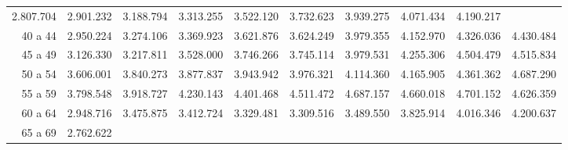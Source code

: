 \begin{tabular}{llllllllll}
  \multicolumn{1}{|r}{2.807.704} &
  \multicolumn{1}{r}{2.901.232} &
  \multicolumn{1}{r}{3.188.794} &
  \multicolumn{1}{r}{3.313.255} &
  \multicolumn{1}{r}{3.522.120} &
  \multicolumn{1}{r}{3.732.623} &
  \multicolumn{1}{r}{3.939.275} &
  \multicolumn{1}{r}{4.071.434} &
  \multicolumn{1}{r}{4.190.217} \\
\multicolumn{1}{r}{40 a 44\hspace{1em}} &
  \multicolumn{1}{|r}{2.950.224} &
  \multicolumn{1}{r}{3.274.106} &
  \multicolumn{1}{r}{3.369.923} &
  \multicolumn{1}{r}{3.621.876} &
  \multicolumn{1}{r}{3.624.249} &
  \multicolumn{1}{r}{3.979.355} &
  \multicolumn{1}{r}{4.152.970} &
  \multicolumn{1}{r}{4.326.036} &
  \multicolumn{1}{r}{4.430.484} \\
\multicolumn{1}{r}{45 a 49\hspace{1em}} &
  \multicolumn{1}{|r}{3.126.330} &
  \multicolumn{1}{r}{3.217.811} &
  \multicolumn{1}{r}{3.528.000} &
  \multicolumn{1}{r}{3.746.266} &
  \multicolumn{1}{r}{3.745.114} &
  \multicolumn{1}{r}{3.979.531} &
  \multicolumn{1}{r}{4.255.306} &
  \multicolumn{1}{r}{4.504.479} &
  \multicolumn{1}{r}{4.515.834} \\
\multicolumn{1}{r}{50 a 54\hspace{1em}} &
  \multicolumn{1}{|r}{3.606.001} &
  \multicolumn{1}{r}{3.840.273} &
  \multicolumn{1}{r}{3.877.837} &
  \multicolumn{1}{r}{3.943.942} &
  \multicolumn{1}{r}{3.976.321} &
  \multicolumn{1}{r}{4.114.360} &
  \multicolumn{1}{r}{4.165.905} &
  \multicolumn{1}{r}{4.361.362} &
  \multicolumn{1}{r}{4.687.290} \\
\multicolumn{1}{r}{55 a 59\hspace{1em}} &
  \multicolumn{1}{|r}{3.798.548} &
  \multicolumn{1}{r}{3.918.727} &
  \multicolumn{1}{r}{4.230.143} &
  \multicolumn{1}{r}{4.401.468} &
  \multicolumn{1}{r}{4.511.472} &
  \multicolumn{1}{r}{4.687.157} &
  \multicolumn{1}{r}{4.660.018} &
  \multicolumn{1}{r}{4.701.152} &
  \multicolumn{1}{r}{4.626.359} \\
\multicolumn{1}{r}{60 a 64\hspace{1em}} &
  \multicolumn{1}{|r}{2.948.716} &
  \multicolumn{1}{r}{3.475.875} &
  \multicolumn{1}{r}{3.412.724} &
  \multicolumn{1}{r}{3.329.481} &
  \multicolumn{1}{r}{3.309.516} &
  \multicolumn{1}{r}{3.489.550} &
  \multicolumn{1}{r}{3.825.914} &
  \multicolumn{1}{r}{4.016.346} &
  \multicolumn{1}{r}{4.200.637} \\
\multicolumn{1}{r}{65 a 69\hspace{1em}} &
  \multicolumn{1}{|r}{2.762.622} &

\end{tabular}

